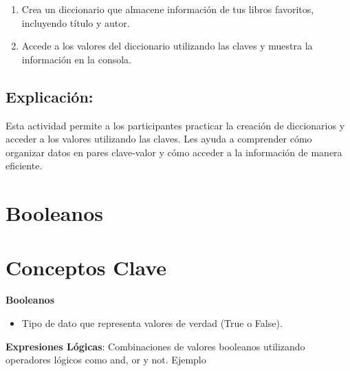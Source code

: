 \documentclass[
  a4paper,
  DIV=11,
  numbers=noendperiod,
  onepage,
  openany]{scrreprt}
\providecommand{\tightlist}{%
  \setlength{\itemsep}{0pt}\setlength{\parskip}{0pt}}\usepackage{longtable,booktabs,array}
\begin{document}
\begin{tcolorbox}[enhanced jigsaw, leftrule=.75mm, bottomtitle=1mm, title=\textcolor{quarto-callout-tip-color}{\faLightbulb}\hspace{0.5em}{Actividad Práctica}, colbacktitle=quarto-callout-tip-color!10!white, coltitle=black, bottomrule=.15mm, colframe=quarto-callout-tip-color-frame, titlerule=0mm, opacityback=0, rightrule=.15mm, toptitle=1mm, opacitybacktitle=0.6, arc=.35mm, breakable, colback=white, toprule=.15mm, left=2mm]

\begin{enumerate}
\def\labelenumi{\arabic{enumi}.}
\tightlist
\item
  Crea un diccionario que almacene información de tus libros favoritos,
  incluyendo título y autor.
\item
  Accede a los valores del diccionario utilizando las claves y muestra
  la información en la consola.
\end{enumerate}

\end{tcolorbox}

\subsection{Explicación:}\label{explicaciuxf3n-11}

Esta actividad permite a los participantes practicar la creación de
diccionarios y acceder a los valores utilizando las claves. Les ayuda a
comprender cómo organizar datos en pares clave-valor y cómo acceder a la
información de manera eficiente.

\section{Booleanos}\label{booleanos}

\section{Conceptos Clave}\label{conceptos-clave-10}

\textbf{Booleanos}

\begin{itemize}
\tightlist
\item
  Tipo de dato que representa valores de verdad (True o False).
\end{itemize}

\textbf{Expresiones Lógicas}: Combinaciones de valores booleanos
utilizando operadores lógicos como and, or y not. Ejemplo
\end{document}
